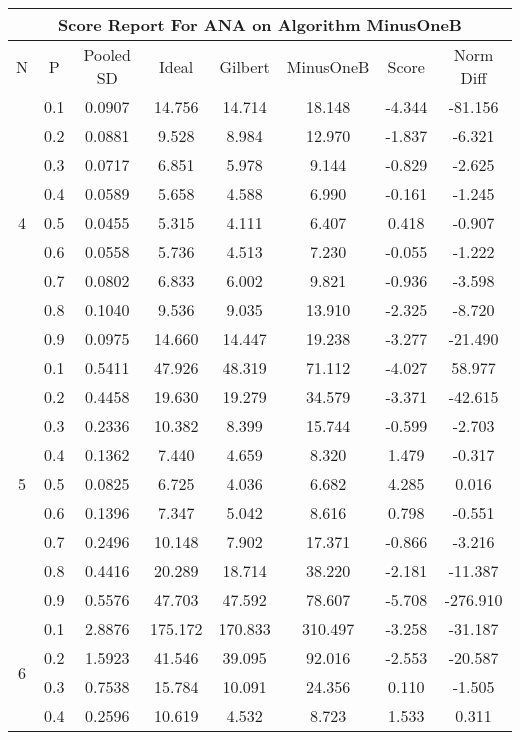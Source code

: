 \documentclass[11pt,a4paper]{report}
\begin{document}
\begin{longtable}{ | c | c || c | c | c | c | c | c | }
\hline
\multicolumn{8}{|c|}{ Score Report For ANA on Algorithm MinusOneB} \\
\hline
N & P & Pooled SD &  Ideal &  Gilbert & MinusOneB  & Score & Norm Diff \\
 \hline
 \hline
 \endhead
\multirow{9}{*}{4} & 0.1 & 0.0907 & 14.756 & 14.714 & 18.148 & -4.344 & -81.156 \\
 & 0.2 & 0.0881 & 9.528 & 8.984 & 12.970 & -1.837 & -6.321 \\
 & 0.3 & 0.0717 & 6.851 & 5.978 & 9.144 & -0.829 & -2.625 \\
 & 0.4 & 0.0589 & 5.658 & 4.588 & 6.990 & -0.161 & -1.245 \\
 & 0.5 & 0.0455 & 5.315 & 4.111 & 6.407 & 0.418 & -0.907 \\
 & 0.6 & 0.0558 & 5.736 & 4.513 & 7.230 & -0.055 & -1.222 \\
 & 0.7 & 0.0802 & 6.833 & 6.002 & 9.821 & -0.936 & -3.598 \\
 & 0.8 & 0.1040 & 9.536 & 9.035 & 13.910 & -2.325 & -8.720 \\
 & 0.9 & 0.0975 & 14.660 & 14.447 & 19.238 & -3.277 & -21.490 \\
 \hline
\multirow{9}{*}{5} & 0.1 & 0.5411 & 47.926 & 48.319 & 71.112 & -4.027 & 58.977 \\
 & 0.2 & 0.4458 & 19.630 & 19.279 & 34.579 & -3.371 & -42.615 \\
 & 0.3 & 0.2336 & 10.382 & 8.399 & 15.744 & -0.599 & -2.703 \\
 & 0.4 & 0.1362 & 7.440 & 4.659 & 8.320 & 1.479 & -0.317 \\
 & 0.5 & 0.0825 & 6.725 & 4.036 & 6.682 & 4.285 & 0.016 \\
 & 0.6 & 0.1396 & 7.347 & 5.042 & 8.616 & 0.798 & -0.551 \\
 & 0.7 & 0.2496 & 10.148 & 7.902 & 17.371 & -0.866 & -3.216 \\
 & 0.8 & 0.4416 & 20.289 & 18.714 & 38.220 & -2.181 & -11.387 \\
 & 0.9 & 0.5576 & 47.703 & 47.592 & 78.607 & -5.708 & -276.910 \\
 \hline
\multirow{9}{*}{6} & 0.1 & 2.8876 & 175.172 & 170.833 & 310.497 & -3.258 & -31.187 \\
 & 0.2 & 1.5923 & 41.546 & 39.095 & 92.016 & -2.553 & -20.587 \\
 & 0.3 & 0.7538 & 15.784 & 10.091 & 24.356 & 0.110 & -1.505 \\
 & 0.4 & 0.2596 & 10.619 & 4.532 & 8.723 & 1.533 & 0.311 \\

\end{longtable}
\end{document}

